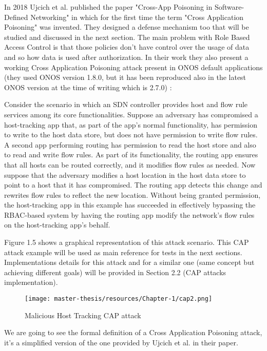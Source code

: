 \documentclass[a4paper,10pt]{memoir}
\begin{document}
In 2018 Ujcich et al. published the paper "Cross-App Poisoning in Software-Defined Networking" in which for the first time the term "Cross Application Poisoning" was invented. They designed a defense mechanism too that will be studied and discussed in the next section. The main problem with Role Based Access Control is that those policies don't have control over the usage of data and so how data is used after authorization. In their work they also present a working Cross Application Poisoning attack present in ONOS default applications (they used ONOS version 1.8.0, but it has been reproduced also in the latest ONOS version at the time of writing which is 2.7.0) \cite{cap-sdn}:
\begin{quoting}[font=itshape, begintext={"}, endtext={"}]
Consider the scenario in which an SDN controller provides host and flow rule services among its core functionalities. Suppose an adversary has compromised a host-tracking app that, as part of the app’s normal functionality, has permission to write to the host data store, but does not have permission to write flow rules. A second app performing routing has permission to read the host store and also to read and write flow rules. As part of its functionality, the routing app ensures that all hosts can be routed correctly, and it modifies flow rules as needed. Now suppose that the adversary modifies a host location in the host data store to point to a host that it has compromised. The routing app detects this change and rewrites flow rules to reflect the new location. Without being granted permission, the host-tracking app in this example has succeeded in effectively bypassing the RBAC-based system by having the routing app modify the network’s flow rules on the host-tracking app’s behalf.
\end{quoting}
Figure 1.5 shows a graphical representation of this attack scenario. This CAP attack example will be used as main reference for tests in the next sections. Implementations details for this attack and for a similar one (same concept but achieving different goals) will be provided in Section 2.2 (CAP attacks implementation).

\begin{figure}[t]
\caption{Malicious Host Tracking CAP attack}
\label{fig:cap2}
\texttt{[image: master-thesis/resources/Chapter-1/cap2.png]}
\centering
\end{figure}

We are going to see the formal definition of a Cross Application Poisoning attack, it's a simplified version of the one provided by Ujcich et al. in their paper. 
\end{document}
